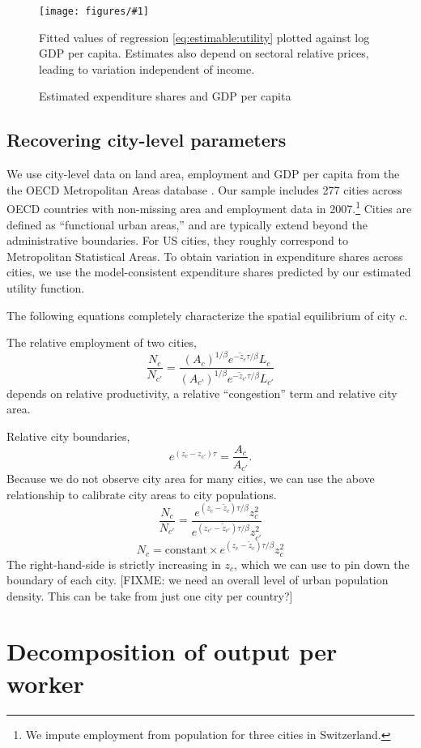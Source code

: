 \documentclass[12pt]{article}
\newcommand{\dofigure}[3]{\begin{figure}
\begin{centering}
\texttt{[image: figures/\#1]}
  \caption{#2\label{fig:#1}}
\end{centering}

\noindent \footnotesize{#3}
\end{figure}}
\begin{document}
\dofigure{city_level_inputs/expenditure_shares}{Estimated expenditure shares and GDP per capita}{Fitted values of regression \eqref{eq:estimable:utility} plotted against log GDP per capita. Estimates also depend on sectoral relative prices, leading to variation independent of income.}

\subsection{Recovering city-level parameters}
We use city-level data on land area, employment and GDP per capita from the the OECD Metropolitan Areas database \cite{oecd}. Our sample includes 277 cities across OECD countries with non-missing area and employment data in 2007.\footnote{We impute employment from population for three cities in Switzerland.} Cities are defined as ``functional urban areas,'' and are typically extend beyond the administrative boundaries. For US cities, they roughly correspond to Metropolitan Statistical Areas. To obtain variation in expenditure shares across cities, we use the model-consistent expenditure shares predicted by our estimated utility function.

The following equations completely characterize the spatial equilibrium of city $c$.



The relative employment of two cities,
\[
\frac{N_c}{N_{c'}}
= \frac
	 {\left(A_c\right)^{1/\beta} e^{-\tilde z_c{\tau/\beta}} L_{c}}
	 {\left(A_{c'}\right)^{1/\beta} e^{-\tilde z_{c'}{\tau/\beta}} L_{c'}}
\]
depends on relative productivity, a relative ``congestion'' term and relative city area.

Relative city boundaries,
\[
e^{(z_{c}-z_{c'}) \tau} =
\frac {A_c}
	{A_{c'}}.
\]
Because we do not observe city area for many cities, we can use the above relationship to calibrate city areas to city populations.
\[
\frac{N_c}{N_{c'}}
= \frac
	 {e^{(z_c-\tilde z_c){\tau/\beta}} z_{c}^2}
	 {e^{(z_{c'}-\tilde z_{c'}){\tau/\beta}} z_{c'}^2}
\]
\[
{N_c}
= \text{constant} \times {e^{(z_c-\tilde z_c){\tau/\beta}} z_{c}^2}
\]
The right-hand-side is strictly increasing in $z_c$, which we can use to pin down the boundary of each city.
[FIXME: we need an overall level of urban population density. This can be take from just one city per country?]



\section{Decomposition of output per worker}
\end{document}
